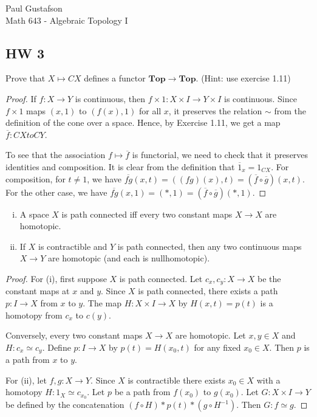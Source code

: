 \documentclass{article}
\begin{document}
\noindent Paul Gustafson\\
\noindent Math 643 - Algebraic Topology I


\subsection*{HW 3}
 Prove that $X \mapsto CX$ defines a functor $\mathbf{Top}  \to \mathbf{Top}$. (Hint: use exercise 1.11)
\begin{proof}
If $f:X \to Y$ is continuous, then $f \times 1: X \times I \to Y \times I$ is continuous. Since $f \times 1$ maps
$(x,1)$ to $(f(x), 1)$ for all $x$, it preserves the relation $\sim$ from the definition of the cone over a space.
Hence, by Exercise 1.11, we get a map $\overline f : CX to CY$. 

To see that the association $f \mapsto \overline f$ is functorial, we need to check that it preserves identities
and composition. It is clear from the definition that $\overline 1_x = 1_{CX}$.  For composition, for $t \neq 1$,
we have $\overline{fg}(x,t) = ((fg)(x),t) = (\overline f \circ \overline g) (x,t)$.  For the other case, we have
$\overline{fg}(x,1) = (*,1) = (\overline f \circ \overline g) (*,1)$.
\end{proof}

 \begin{enumerate}[(i)] 
\item A space $X$ is path connected iff every two constant maps $X \to X$ are homotopic.
\item If $X$ is contractible and $Y$ is path connected, then any two continuous maps
$X \to Y$ are homotopic (and each is nullhomotopic).
\end{enumerate}

\begin{proof}
For (i), first suppose $X$ is path connected.  Let $c_x, c_y: X \to X$ be the constant maps at $x$ and $y$.
Since $X$ is path connected, there exists a path $p:I \to X$ from $x$ to $y$.  
The map $H:X \times I \to X$ by $H(x,t) = p(t)$ is a homotopy from $c_x$ to $c(y)$.

Conversely, every two constant maps $X \to X$ are homotopic. Let $x,y \in X$ and $H: c_x \simeq c_y$. 
Define $p:I \to X$ by $p(t) = H(x_0,t)$ for any fixed $x_0 \in X$. Then $p$ is a path from $x$ to $y$.

For (ii), let $f, g: X \to Y$. Since $X$ is contractible there exists $x_0 \in X$ with a homotopy $H: 1_X \simeq c_{x_0}$.
Let $p$ be a path from $f(x_0)$ to $g(x_0)$. Let $G:X \times I \to Y$ be defined by the concatenation 
$(f \circ H) * p(t) * (g \circ H^{-1})$. Then $G: f \simeq g$.
\end{proof}
\end{document}
